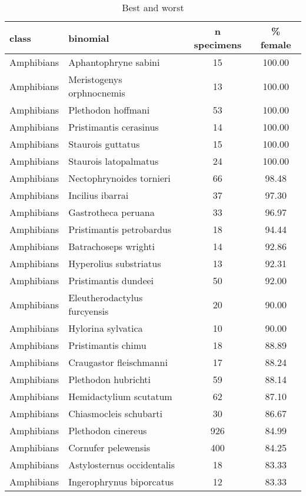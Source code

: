 \begin{longtable}{llcc}
\caption{Best and worst} \\ 
  \hline
class & binomial & n specimens & \% female \\ 
  \hline
Amphibians & Aphantophryne sabini &  15 & 100.00 \\ 
  Amphibians & Meristogenys orphnocnemis &  13 & 100.00 \\ 
  Amphibians & Plethodon hoffmani &  53 & 100.00 \\ 
  Amphibians & Pristimantis cerasinus &  14 & 100.00 \\ 
  Amphibians & Staurois guttatus &  15 & 100.00 \\ 
  Amphibians & Staurois latopalmatus &  24 & 100.00 \\ 
  Amphibians & Nectophrynoides tornieri &  66 & 98.48 \\ 
  Amphibians & Incilius ibarrai &  37 & 97.30 \\ 
  Amphibians & Gastrotheca peruana &  33 & 96.97 \\ 
  Amphibians & Pristimantis petrobardus &  18 & 94.44 \\ 
  Amphibians & Batrachoseps wrighti &  14 & 92.86 \\ 
  Amphibians & Hyperolius substriatus &  13 & 92.31 \\ 
  Amphibians & Pristimantis dundeei &  50 & 92.00 \\ 
  Amphibians & Eleutherodactylus furcyensis &  20 & 90.00 \\ 
  Amphibians & Hylorina sylvatica &  10 & 90.00 \\ 
  Amphibians & Pristimantis chimu &  18 & 88.89 \\ 
  Amphibians & Craugastor fleischmanni &  17 & 88.24 \\ 
  Amphibians & Plethodon hubrichti &  59 & 88.14 \\ 
  Amphibians & Hemidactylium scutatum &  62 & 87.10 \\ 
  Amphibians & Chiasmocleis schubarti &  30 & 86.67 \\ 
  Amphibians & Plethodon cinereus & 926 & 84.99 \\ 
  Amphibians & Cornufer pelewensis & 400 & 84.25 \\ 
  Amphibians & Astylosternus occidentalis &  18 & 83.33 \\ 
  Amphibians & Ingerophrynus biporcatus &  12 & 83.33 \\ 

\end{longtable}
